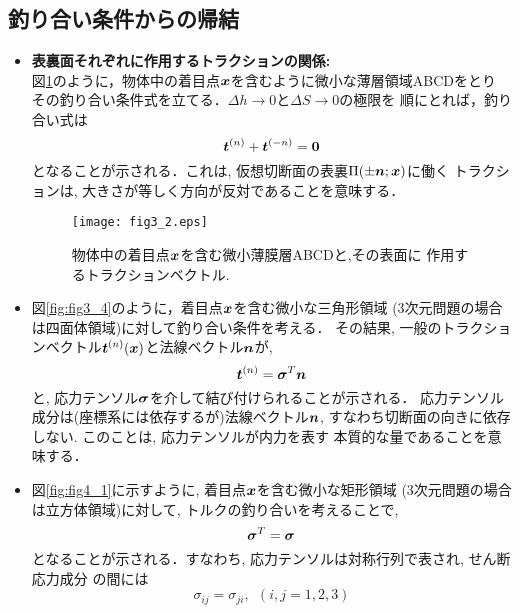 \documentclass[10pt,a4j]{jbook}
\begin{document}
\subsection{釣り合い条件からの帰結}\label{equib}
\begin{itemize}
\item
	{\bf 表裏面それぞれに作用するトラクションの関係:}\\
	図\ref{fig:fig3_2}のように，物体中の着目点$\mbox{\boldmath $x$}$を含むように微小な薄層領域ABCDをとり
	その釣り合い条件式を立てる．$\Delta h \rightarrow 0$と$\Delta S\rightarrow 0$の極限を
	順にとれば，釣り合い式は
	\begin{equation}
		\mbox{\boldmath $t$}^{(n)}+\mbox{\boldmath $t$}^{(-n)}=\mbox{\boldmath $0$}
		\label{eqn:t_pmn}
	\end{equation}
	となることが示される．これは, 仮想切断面の表裏$\Pi(\pm \mbox{\boldmath $n$};\mbox{\boldmath $x$})$に働く
	トラクションは, 大きさが等しく方向が反対であることを意味する．
\begin{figure}[h]
	\begin{center}
	\texttt{[image: fig3\_2.eps]} 
	\end{center}
	\caption{物体中の着目点$\mbox{\boldmath $x$}$を含む微小薄膜層ABCDと,その表面に
	作用するトラクションベクトル. } 
	\label{fig:fig3_2}
\end{figure}
\item
	図\ref{fig:fig3_4}のように，着目点$\mbox{\boldmath $x$}$を含む微小な三角形領域
	(3次元問題の場合は四面体領域)に対して釣り合い条件を考える．
	その結果, 一般のトラクションベクトル$\mbox{\boldmath $t$}^{(n)}(\mbox{\boldmath $x$})$と法線ベクトル$\mbox{\boldmath $n$}$が, 
	\begin{equation}
		\mbox{\boldmath $t$}^{(n)}=\mbox{\boldmath $\sigma$}^{T}\mbox{\boldmath $n$}
		\label{eqn:t_as_sign}
	\end{equation}
	と, 応力テンソル$\mbox{\boldmath $\sigma$}$を介して結び付けられることが示される．
	応力テンソル成分は(座標系には依存するが)法線ベクトル$\mbox{\boldmath $n$}$, 
	すなわち切断面の向きに依存しない. このことは, 応力テンソルが内力を表す
	本質的な量であることを意味する．
\item
	図\ref{fig:fig4_1}に示すように, 着目点$\mbox{\boldmath $x$}$を含む微小な矩形領域
	(3次元問題の場合は立方体領域)に対して, トルクの釣り合いを考えることで, 
	\begin{equation}
		\mbox{\boldmath $\sigma$}^{T}=\mbox{\boldmath $\sigma$}
		\label{eqn:sig_sym}
	\end{equation}
	となることが示される．すなわち, 応力テンソルは対称行列で表され, せん断応力成分
	の間には
	\begin{equation}
		\sigma_{ij}=\sigma_{ji}, \ \ (i,j=1,2,3)
		\label{eqn:sig_sym_comp}
	\end{equation}

\end{itemize}
\end{document}

